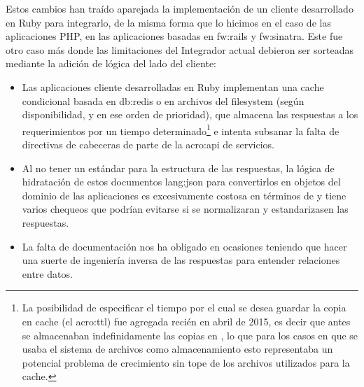 Estos cambios han traído aparejada la implementación de un cliente desarrollado en Ruby para integrarlo, de la misma forma que lo hicimos en el caso de las aplicaciones PHP, en las aplicaciones basadas en \gls{fw:rails} y \gls{fw:sinatra}. Este fue otro caso más donde las limitaciones del Integrador actual debieron ser sorteadas mediante la adición de lógica del lado del cliente:

\begin{itemize}
  \item Las aplicaciones cliente desarrolladas en Ruby implementan una cache condicional basada en \gls{db:redis} o en archivos del filesystem (según disponibilidad, y en ese orden de prioridad), que almacena las respuestas a los requerimientos por un tiempo determinado\footnote{La posibilidad de especificar el tiempo por el cual se desea guardar la copia en cache (el \gls{acro:ttl}) fue agregada recién en abril de 2015, es decir que antes se almacenaban indefinidamente las copias en , lo que para los casos en que se usaba el sistema de archivos como almacenamiento esto representaba un potencial problema de crecimiento sin tope de los archivos utilizados para la cache.} e intenta subsanar la falta de directivas de cabeceras de parte de la \gls{acro:api} de servicios.

  \item Al no tener un estándar para la estructura de las respuestas, la lógica de hidratación de estos documentos \gls{lang:json} para convertirlos en objetos del dominio de las aplicaciones es excesivamente costosa en términos de  y tiene varios chequeos que podrían evitarse si se normalizaran y estandarizasen las respuestas.

  \item La falta de documentación nos ha obligado en ocasiones teniendo que hacer una suerte de ingeniería inversa de las respuestas para entender relaciones entre datos.
\end{itemize}

